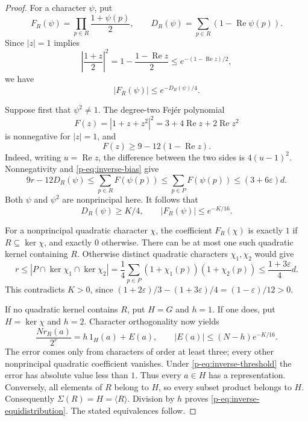 \documentclass[11pt,a4paper]{article}
\theoremstyle{definition}
\theoremstyle{remark}
\begin{document}
\begin{proof}
For a character $\psi$, put
\[
 F_R(\psi)=\prod_{p\in R}\frac{1+\psi(p)}2,
 \qquad
 D_R(\psi)=\sum_{p\in R}(1-\operatorname{Re}\psi(p)).
\]
Since $|z|=1$ implies
\[
 \left|\frac{1+z}{2}\right|^2
 =1-\frac{1-\operatorname{Re}z}{2}
 \leq e^{-(1-\operatorname{Re}z)/2},
\]
we have
\begin{equation}\label{p-eq:inverse-fourier-product}
 |F_R(\psi)|\leq e^{-D_R(\psi)/4}.
\end{equation}

Suppose first that $\psi^2\ne1$. The degree-two Fej\'er polynomial
\[
 F(z)=|1+z+z^2|^2
     =3+4\operatorname{Re}z+2\operatorname{Re}z^2
\]
is nonnegative for $|z|=1$, and
\begin{equation}\label{p-eq:fejer-lower}
 F(z)\geq9-12(1-\operatorname{Re}z).
\end{equation}
Indeed, writing $u=\operatorname{Re}z$, the difference between the two
sides is $4(u-1)^2$. Nonnegativity and \eqref{p-eq:inverse-bias} give
\[
 9r-12D_R(\psi)
 \leq\sum_{p\in R}F(\psi(p))
 \leq\sum_{p\in P}F(\psi(p))
 \leq(3+6\varepsilon)d.
\]
Both $\psi$ and $\psi^2$ are nonprincipal here. It follows that
\[
 D_R(\psi)\geq K/4,
 \qquad |F_R(\psi)|\leq e^{-K/16}.
\]

For a nonprincipal quadratic character $\chi$, the coefficient
$F_R(\chi)$ is exactly $1$ if $R\subseteq\ker\chi$, and exactly $0$
otherwise. There can be at most one such quadratic kernel containing
$R$. Otherwise distinct quadratic characters $\chi_1,\chi_2$ would give
\[
 r\leq |P\cap\ker\chi_1\cap\ker\chi_2|
 =\frac14\sum_{p\in P}(1+\chi_1(p))(1+\chi_2(p))
 \leq\frac{1+3\varepsilon}{4}d.
\]
This contradicts $K>0$, since
$(1+2\varepsilon)/3-(1+3\varepsilon)/4=(1-\varepsilon)/12>0$.

If no quadratic kernel contains $R$, put $H=G$ and $h=1$. If one does,
put $H=\ker\chi$ and $h=2$. Character orthogonality now yields
\[
 \frac{N r_R(a)}{2^r}
 =h\,1_H(a)+E(a),
 \qquad |E(a)|\leq (N-h)e^{-K/16}.
\]
The error comes only from characters of order at least three; every
other nonprincipal quadratic coefficient vanishes. Under
\eqref{p-eq:inverse-threshold} the error has absolute value less than $1$.
Thus every $a\in H$ has a representation. Conversely, all elements of
$R$ belong to $H$, so every subset product belongs to $H$.
Consequently $\Sigma(R)=H=\langle R\rangle$. Division by $h$ proves
\eqref{p-eq:inverse-equidistribution}. The stated equivalences follow.
\end{proof}
\end{document}
